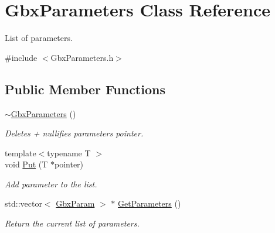 \hypertarget{classGbxParameters}{\section{Gbx\-Parameters Class Reference}
\label{classGbxParameters}
}


List of parameters.  




{\ttfamily \#include $<$Gbx\-Parameters.\-h$>$}

\subsection*{Public Member Functions}
\begin{DoxyCompactItemize}
\item 
\hypertarget{classGbxParameters_afac5dd05e28a0e7014483317fc83fdf5}{\hyperlink{classGbxParameters_afac5dd05e28a0e7014483317fc83fdf5}{$\sim$\-Gbx\-Parameters} ()}\label{classGbxParameters_afac5dd05e28a0e7014483317fc83fdf5}

\begin{DoxyCompactList}\small\item\em Deletes + nullifies parameters pointer. \end{DoxyCompactList}\item 
{\footnotesize template$<$typename T $>$ }\\void \hyperlink{classGbxParameters_a2cf83794717cf9fdc13e5ff12e259f04}{Put} (T $\ast$pointer)
\begin{DoxyCompactList}\small\item\em Add parameter to the list. \end{DoxyCompactList}\item 
\hypertarget{classGbxParameters_ac980093c86726dd0c71ba46b88885ca1}{std\-::vector$<$ \hyperlink{structGbxParam}{Gbx\-Param} $>$ $\ast$ \hyperlink{classGbxParameters_ac980093c86726dd0c71ba46b88885ca1}{Get\-Parameters} ()}\label{classGbxParameters_ac980093c86726dd0c71ba46b88885ca1}

\begin{DoxyCompactList}\small\item\em Return the current list of parameters. \end{DoxyCompactList}\end{DoxyCompactItemize}
